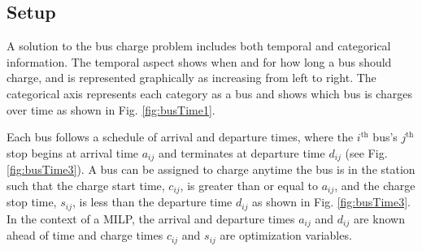 \subsection{Setup}
\par A solution to the bus charge problem includes both temporal and categorical information. The temporal aspect shows when and for how long a bus should charge, and is represented graphically as increasing from left to right. The categorical axis represents each category as a bus and shows which bus is charges over time as shown in Fig. \ref{fig:busTime1}.

\par Each bus follows a schedule of arrival and departure times, where the $i^{\text{th}}$ bus's $j^{\text{th}}$ stop begins at arrival time $a_{ij}$ and terminates at departure time $d_{ij}$ (see Fig. \ref{fig:busTime3}).  A bus can be assigned to charge anytime the bus is in the station such that the charge start time, $c_{ij}$, is greater than or equal to $a_{ij}$, and the charge stop time, $s_{ij}$, is less than the departure time $d_{ij}$ as shown in Fig. \ref{fig:busTime3}. In the context of a MILP, the arrival and departure times $a_{ij}$ and $d_{ij}$ are known ahead of time and charge times $c_{ij}$ and $s_{ij}$ are optimization variables. 

